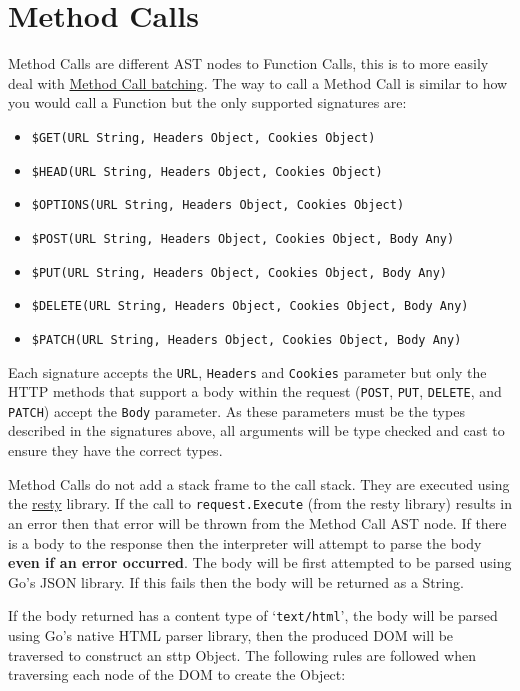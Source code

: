 \section{Method Calls}
\label{sec:method-calls}

Method Calls are different AST nodes to Function Calls, this is to more easily deal with \hyperref[sec:batching]{Method Call batching}. The way to call a Method Call is similar to how you would call a Function but the only supported signatures are:

\begin{itemize}
    \item \verb|$GET(URL String, Headers Object, Cookies Object)|
    \item \verb|$HEAD(URL String, Headers Object, Cookies Object)|
    \item \verb|$OPTIONS(URL String, Headers Object, Cookies Object)|
    \item \verb|$POST(URL String, Headers Object, Cookies Object, Body Any)|
    \item \verb|$PUT(URL String, Headers Object, Cookies Object, Body Any)|
    \item \verb|$DELETE(URL String, Headers Object, Cookies Object, Body Any)|
    \item \verb|$PATCH(URL String, Headers Object, Cookies Object, Body Any)|
\end{itemize}

Each signature accepts the \verb|URL|, \verb|Headers| and \verb|Cookies| parameter but only the HTTP methods that support a body within the request (\verb|POST|, \verb|PUT|, \verb|DELETE|, and \verb|PATCH|) accept the \verb|Body| parameter. As these parameters must be the types described in the signatures above, all arguments will be type checked and cast to ensure they have the correct types.

Method Calls do not add a stack frame to the call stack. They are executed using the \href{https://github.com/go-resty/resty}{resty} library. If the call to \verb|request.Execute| (from the resty library) results in an error then that error will be thrown from the Method Call AST node. If there is a body to the response then the interpreter will attempt to parse the body \textbf{even if an error occurred}. The body will be first attempted to be parsed using Go's JSON library. If this fails then the body will be returned as a String.

If the body returned has a content type of `\verb|text/html|', the body will be parsed using Go's native HTML parser library, then the produced DOM will be traversed to construct an sttp Object. The following rules are followed when traversing each node of the DOM to create the Object:

